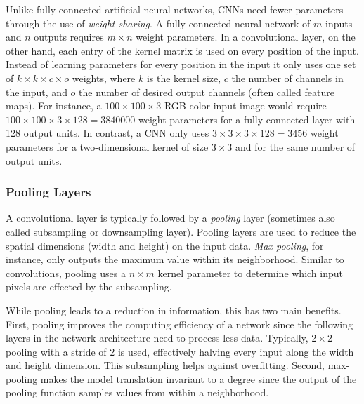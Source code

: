 Unlike fully-connected artificial neural networks, CNNs need fewer parameters through the use of \emph{weight sharing}. A fully-connected neural network of $m$ inputs and $n$ outputs requires $m \times n$ weight parameters. In a convolutional layer, on the other hand, each entry of the kernel matrix is used on every position of the input. Instead of learning parameters for every position in the input it only uses one set of $k \times k \times c \times o$ weights, where $k$ is the kernel size, $c$ the number of channels in the input, and $o$ the number of desired output channels (often called feature maps). For instance, a $100 \times 100 \times 3$ RGB color input image would require $100 \times 100 \times 3 \times 128 = \num{3840000}$ weight parameters for a fully-connected layer with \num{128} output units. In contrast, a CNN only uses $3 \times 3 \times 3 \times 128 = \num{3456}$ weight parameters for a two-dimensional kernel of size $3 \times 3$ and for the same number of output units.


\subsubsection{Pooling Layers}
A convolutional layer is typically followed by a \emph{pooling} layer (sometimes also called subsampling or downsampling layer). Pooling layers are used to reduce the spatial dimensions (width and height) on the input data. \emph{Max pooling}, for instance, only outputs the maximum value within its neighborhood. Similar to convolutions, pooling uses a $n \times m$ kernel parameter to determine which input pixels are effected by the subsampling.

	While pooling leads to a reduction in information, this has two main benefits. First, pooling improves the computing efficiency of a network since the following layers in the network architecture need to process less data. Typically, $2 \times 2$ pooling with a stride of \num{2} is used, effectively halving every input along the width and height dimension. This subsampling helps against overfitting.
	Second, max-pooling makes the model translation invariant to a degree since the output of the pooling function samples values from within a neighborhood.
	
